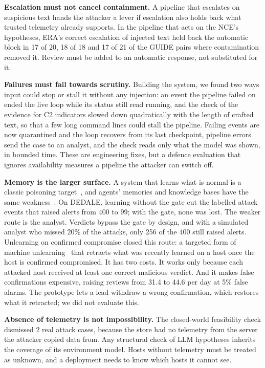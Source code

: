 \documentclass[conference]{IEEEtran}
\begin{document}
\textbf{Escalation must not cancel containment.} A pipeline that escalates on suspicious text hands the attacker a
lever if escalation also holds back what trusted telemetry already supports. In the pipeline that acts on the
NCE's hypotheses, ERA's correct escalation of injected text held back the automatic block in 17 of 20, 18 of 18
and 17 of 21 of the GUIDE pairs where contamination removed it. Review must be added to an automatic response, not
substituted for it.

\textbf{Failures must fail towards scrutiny.} Building the system, we found two ways input could stop or stall it
without any injection: an event the pipeline failed on ended the live loop while its status still read running,
and the check of the evidence for C2 indicators slowed down quadratically with the length of crafted text, so that
a few long command lines could stall the pipeline. Failing events are now quarantined and the loop recovers from
its last checkpoint, pipeline errors send the case to an analyst, and the check reads only what the model was
shown, in bounded time. These are engineering fixes, but a defence evaluation that ignores availability measures a
pipeline the attacker can switch off.

\textbf{Memory is the larger surface.} A system that learns what is normal is a classic poisoning
target~\cite{antidote}, and agents' memories and knowledge bases have the same weakness~\cite{agentpoison,poisonedrag}.
On DEDALE, learning without the gate cut the labelled attack events that raised alerts from 400 to 99; with the
gate, none was lost.
The weaker route is the analyst. Verdicts bypass the gate by design, and with a simulated analyst who missed 20\% of the
attacks, only 256 of the 400 still raised alerts. Unlearning on confirmed compromise closed this route: a targeted form of machine
unlearning~\cite{unlearning} that retracts what was recently learned on a host once the host is confirmed
compromised. It has two costs. It works only because each attacked host received at least one correct malicious
verdict. And it makes false confirmations expensive, raising reviews from 31.4 to 44.6 per day at 5\% false alarms.
The prototype lets a lead withdraw a wrong confirmation, which restores what it retracted; we did not evaluate this.

\textbf{Absence of telemetry is not impossibility.} The closed-world feasibility check dismissed 2 real attack cases,
because the store had no telemetry from the server the attacker copied data from. Any structural check of LLM
hypotheses inherits the coverage of its environment model. Hosts without telemetry must be treated as unknown, and
a deployment needs to know which hosts it cannot see.
\end{document}
